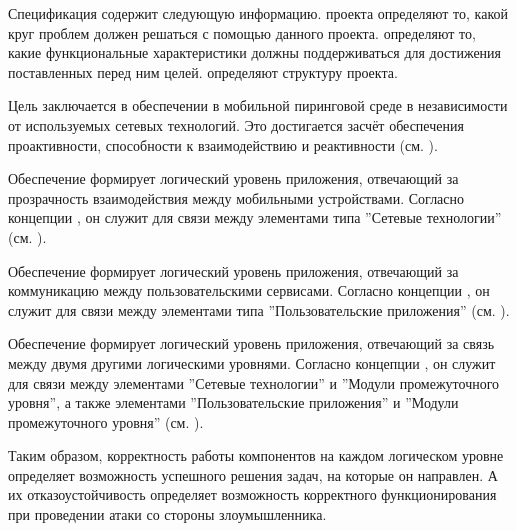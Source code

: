 %
Спецификация  содержит следующую информацию.
%
 проекта определяют то, какой круг проблем должен решаться с помощью данного проекта. 
%
 определяют то, какие функциональные характеристики должны поддерживаться  для достижения поставленных перед ним целей. 
%
 определяют структуру проекта. 



%
Цель  заключается в обеспечении  в мобильной пиринговой среде в независимости от используемых сетевых технологий. 
%
Это достигается засчёт обеспечения проактивности, способности к взаимодействию и реактивности (см. ).

%
Обеспечение  формирует логический уровень приложения, отвечающий за прозрачность взаимодействия между мобильными устройствами.
%
Согласно концепции , он служит для связи между элементами типа ''Сетевые технологии'' (см. ). 

%
Обеспечение  формирует логический уровень приложения, отвечающий за коммуникацию между пользовательскими сервисами. 
%
Согласно концепции , он служит для связи между элементами типа ''Пользовательские приложения'' (см. ). 

%
Обеспечение  формирует логический уровень приложения, отвечающий за связь между двумя другими логическими уровнями. 
%
Согласно концепции , он служит для связи между элементами ''Сетевые технологии'' и ''Модули промежуточного уровня'', а также элементами ''Пользовательские приложения'' и ''Модули промежуточного уровня'' (см. ). 

%
Таким образом, корректность работы компонентов  на каждом логическом уровне определяет возможность успешного решения задач, на которые он направлен. 
%
А их отказоустойчивость определяет возможность корректного функционирования  при проведении атаки со стороны злоумышленника.

